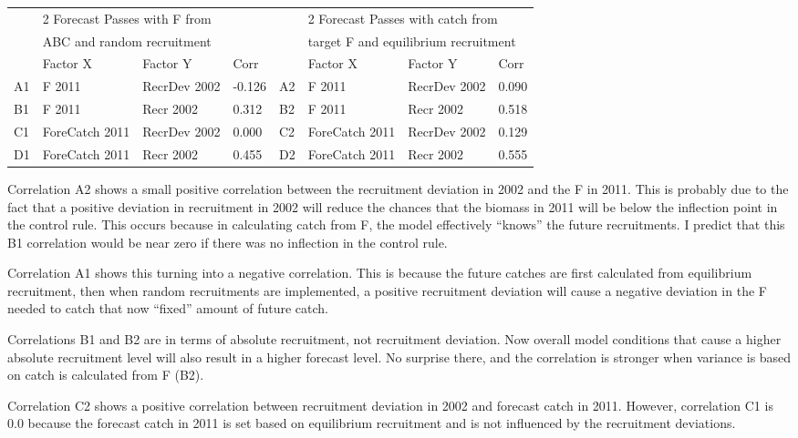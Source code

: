 \begin{center}
	\begin{longtable}{p{0.4cm} p{2.75cm} p{3cm} p{1cm} p{0.4cm} p{2.75cm} p{2cm} p{1cm}}
		\hline
		 & \multicolumn{3}{l}{2 Forecast Passes with F from} & & \multicolumn{3}{l}{2 Forecast Passes with catch from} \\
		 & \multicolumn{3}{l}{ABC and random recruitment} & & \multicolumn{3}{l}{target F and equilibrium recruitment} \\
		\hline
		 & Factor X & Factor Y & Corr & & Factor X & Factor Y & Corr \\
		\hline
		A1 & F 2011 & RecrDev 2002 & -0.126 & A2 & F 2011 & RecrDev 2002 & 0.090 \\
		B1 & F 2011 & Recr 2002 & 0.312 & B2 & F 2011 & Recr 2002 & 0.518 \\
		C1 & ForeCatch 2011 & RecrDev 2002 & 0.000 & C2 & ForeCatch 2011 & RecrDev 2002 & 0.129 \\
		D1 & ForeCatch 2011 & Recr 2002 & 0.455 & D2 & ForeCatch 2011 & Recr 2002 & 0.555 \\
		\hline		
	\end{longtable}
\end{center}

Correlation A2 shows a small positive correlation between the recruitment deviation in 2002 and the F in 2011. This is probably due to the fact that a positive deviation in recruitment in 2002 will reduce the chances that the biomass in 2011 will be below the inflection point in the control rule. This occurs because in calculating catch from F, the model effectively ``knows'' the future recruitments. I predict that this B1 correlation would be near zero if there was no inflection in the control rule.

Correlation A1 shows this turning into a negative correlation. This is because the future catches are first calculated from equilibrium recruitment, then when random recruitments are implemented, a positive recruitment deviation will cause a negative deviation in the F needed to catch that now ``fixed'' amount of future catch.

Correlations B1 and B2 are in terms of absolute recruitment, not recruitment deviation. Now overall model conditions that cause a higher absolute recruitment level will also result in a higher forecast level. No surprise there, and the correlation is stronger when variance is based on catch is calculated from F (B2).

Correlation C2 shows a positive correlation between recruitment deviation in 2002 and forecast catch in 2011. However, correlation C1 is 0.0 because the forecast catch in 2011 is set based on equilibrium recruitment and is not influenced by the recruitment deviations.

